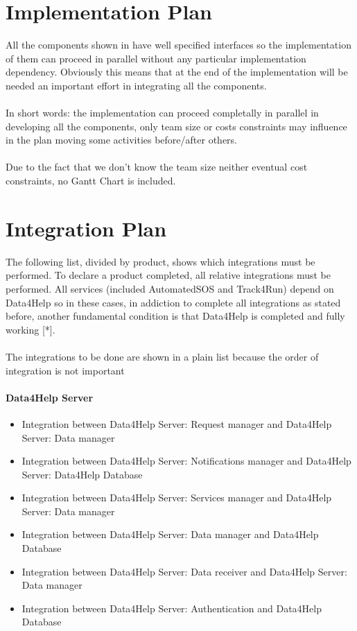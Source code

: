 	\section{Implementation Plan}
		All the components shown in  have well specified interfaces so the implementation of them can proceed in parallel without any particular implementation dependency. Obviously this means that at the end of the implementation will be needed an important effort in integrating all the components.\\ \\
		In short words: the implementation can proceed completally in parallel in developing all the components, only team size or costs constraints may influence in the plan moving some activities before/after others. \\ \\ Due to the fact that we don't know the team size neither eventual cost constraints, no Gantt Chart is included.

	\section{Integration Plan}
		The following list, divided by product, shows which integrations must be performed. To declare a product completed, all relative integrations must be performed. All services (included AutomatedSOS and Track4Run) depend on Data4Help so in these cases, in addiction to complete all integrations as stated before, another fundamental condition is that Data4Help is completed and fully working [*].\\ \\
		The integrations to be done are shown in a plain list because the order of integration is not important

		\paragraph{Data4Help Server}
		\begin{itemize}
			\item{Integration between Data4Help Server: Request manager and Data4Help Server: Data manager}
			\item{Integration between Data4Help Server: Notifications manager and Data4Help Server: Data4Help Database}
			\item{Integration between Data4Help Server: Services manager and Data4Help Server: Data manager}
			\item{Integration between Data4Help Server: Data manager and Data4Help Database}
			\item{Integration between Data4Help Server: Data receiver and Data4Help Server: Data manager}
			\item{Integration between Data4Help Server: Authentication and Data4Help Database}
		\end{itemize}

